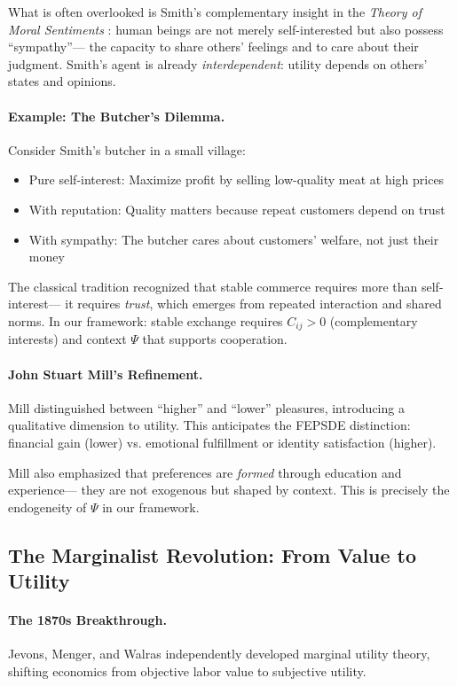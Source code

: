 \documentclass[12pt,a4paper]{article}
\begin{document}
What is often overlooked is Smith's complementary insight in the \emph{Theory of Moral Sentiments} \citep{smith1759}:
human beings are not merely self-interested but also possess ``sympathy''---
the capacity to share others' feelings and to care about their judgment.
Smith's agent is already \emph{interdependent}: utility depends on others' states and opinions.

\paragraph{Example: The Butcher's Dilemma.}
Consider Smith's butcher in a small village:
\begin{itemize}
  \item Pure self-interest: Maximize profit by selling low-quality meat at high prices
  \item With reputation: Quality matters because repeat customers depend on trust
  \item With sympathy: The butcher cares about customers' welfare, not just their money
\end{itemize}

The classical tradition recognized that stable commerce requires more than self-interest---
it requires \emph{trust}, which emerges from repeated interaction and shared norms.
In our framework: stable exchange requires $C_{ij} > 0$ (complementary interests)
and context $\Psi$ that supports cooperation.

\paragraph{John Stuart Mill's Refinement.}
Mill \citep{mill1848} distinguished between ``higher'' and ``lower'' pleasures,
introducing a qualitative dimension to utility.
This anticipates the FEPSDE distinction:
financial gain (lower) vs. emotional fulfillment or identity satisfaction (higher).

Mill also emphasized that preferences are \emph{formed} through education and experience---
they are not exogenous but shaped by context.
This is precisely the endogeneity of $\Psi$ in our framework.

\subsection{The Marginalist Revolution: From Value to Utility}

\paragraph{The 1870s Breakthrough.}
Jevons, Menger, and Walras independently developed marginal utility theory,
shifting economics from objective labor value to subjective utility.
\end{document}
